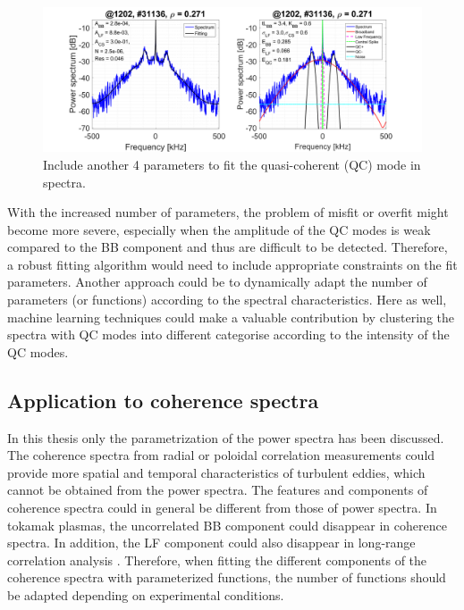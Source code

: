 \begin{figure}[h]
\begin{centering}
\includegraphics[scale=0.4]{fig_QC_fit.png}
\par\end{centering}
\caption{Include another 4 parameters to fit the quasi-coherent (QC) mode in spectra.}
\label{fig:QC_fit}
\end{figure}

With the increased number of parameters, the problem of misfit or overfit might become more severe, especially when the amplitude of the QC modes is weak compared to the BB component and thus are difficult to be detected. Therefore, a robust fitting algorithm would need to include appropriate constraints on the fit parameters. Another approach could be to dynamically adapt the number of parameters (or functions) according to the spectral characteristics. Here as well, machine learning techniques could make a valuable contribution by clustering the spectra with QC modes into different categorise according to the intensity of the QC modes.


\subsection*{Application to coherence spectra}

In this thesis only the parametrization of the power spectra has been discussed. The coherence spectra from radial or poloidal correlation measurements could provide more spatial and temporal characteristics of turbulent eddies, which cannot be obtained from the power spectra. The features and components of coherence spectra could in general be different from those of power spectra. In tokamak plasmas, the uncorrelated BB component could disappear in coherence spectra. In addition, the LF component could also disappear in long-range correlation analysis \cite{Kramer-Flecken_2015_NJP}. Therefore, when fitting the different components of the coherence spectra with parameterized functions, the number of functions should be adapted depending on experimental conditions.
